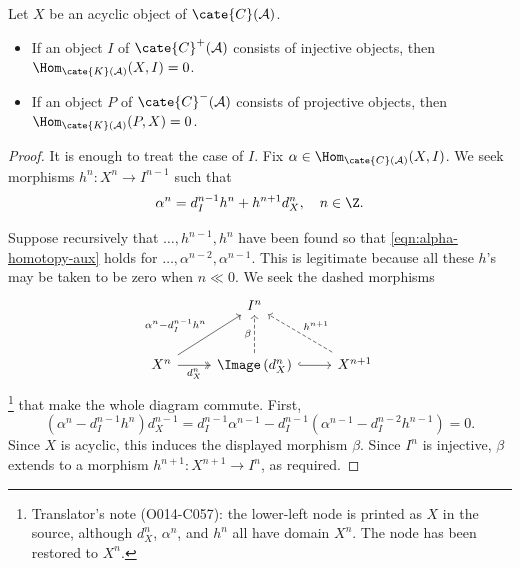 \begin{lemma}\label{prop:resolution-homotopy-aux}
	Let $X$ be an acyclic object of $\cate{C}(\mathcal{A})$.
	\begin{itemize}
		\item If an object $I$ of $\cate{C}^+(\mathcal{A})$ consists of
		injective objects, then $\Hom_{\cate{K}(\mathcal{A})}(X,I)=0$.
		\item If an object $P$ of $\cate{C}^-(\mathcal{A})$ consists of
		projective objects, then $\Hom_{\cate{K}(\mathcal{A})}(P,X)=0$.
	\end{itemize}
\end{lemma}
\begin{proof}
	It is enough to treat the case of $I$. Fix
	$\alpha\in\Hom_{\cate{C}(\mathcal{A})}(X,I)$. We seek morphisms
	$h^n:X^n\to I^{n-1}$ such that
	\begin{equation}\label{eqn:alpha-homotopy-aux}
		\alpha^n = d_I^{n-1} h^n + h^{n+1} d_X^n , \quad n \in \Z.
	\end{equation}

	Suppose recursively that $\ldots,h^{n-1},h^n$ have been found so that
	\eqref{eqn:alpha-homotopy-aux} holds for
	$\ldots,\alpha^{n-2},\alpha^{n-1}$. This is legitimate because all these
	$h$'s may be taken to be zero when $n\ll0$. We seek the dashed morphisms
	\[\begin{tikzcd}[row sep=large]
		& I^n & \\
		X^n \arrow[twoheadrightarrow, r, "{d_X^n}"'] \arrow[ru, "{\alpha^n - d_I^{n-1} h^n}"] & \Image\left( d_X^n \right) \arrow[dashed, u, "\beta"] \arrow[hookrightarrow, r] & X^{n+1} \arrow[dashed, lu, "{h^{n+1}}"']
	\end{tikzcd}\]%
	\footnote{Translator's note (O014-C057): the lower-left node is printed as
	$X$ in the source, although $d_X^n$, $\alpha^n$, and $h^n$ all have domain
	$X^n$. The node has been restored to $X^n$.}
	that make the whole diagram commute. First,
	\[ \left( \alpha^n - d_I^{n-1} h^n \right) d_X^{n-1} = d_I^{n-1} \alpha^{n-1} - d_I^{n-1} \left( \alpha^{n-1} - d_I^{n-2} h^{n-1} \right) = 0. \]
	Since $X$ is acyclic, this induces the displayed morphism $\beta$. Since
	$I^n$ is injective, $\beta$ extends to a morphism
	$h^{n+1}:X^{n+1}\to I^n$, as required.
\end{proof}

